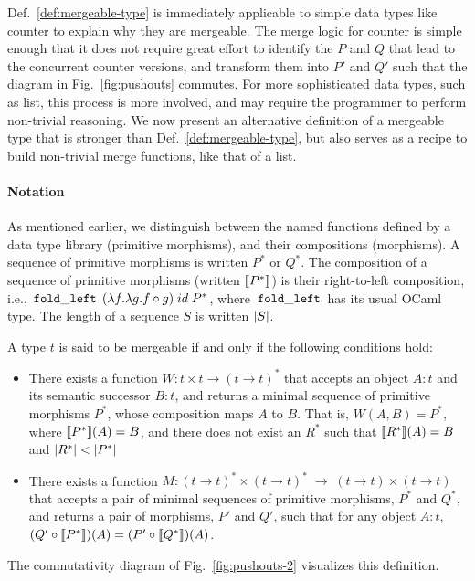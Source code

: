 
Def.~\ref{def:mergeable-type} is immediately applicable to simple data
types like counter to explain why they are mergeable. The merge logic
for counter is simple enough that it does not require great effort to
identify the $P$ and $Q$ that lead to the concurrent counter versions,
and transform them into $P'$ and $Q'$ such that the diagram in
Fig.~\ref{fig:pushouts} commutes. For more
sophisticated data types, such as list, this process is more involved,
and may require the programmer to perform non-trivial reasoning. We
now present an alternative definition of a mergeable type that is
stronger than Def.~\ref{def:mergeable-type}, but also serves as a
recipe to build non-trivial merge functions, like that of a list.

\paragraph{Notation} As mentioned earlier, we distinguish between the
named functions defined by a data type library (primitive morphisms),
and their compositions (morphisms). A sequence of primitive morphisms
is written $P^*$ or $Q^*$. The composition of a sequence of primitive
morphisms (written $\llbracket P^* \rrbracket$) is their right-to-left composition,
i.e., $\,{\tt fold\_left}\,\;(\lambda f.\lambda g. f \circ g)\; id\; P^*$,
where $\,{\tt fold\_left}\,$ has its usual OCaml type. The length of a
sequence $S$ is written $\left|S\right|$.

\begin{definition} 
\label{def:mergeable-type-2}
A type $t$ is said to be mergeable if and only if the following
conditions hold:
\begin{itemize}
  \item There exists a function $W: t \times t \rightarrow (t
  \rightarrow t)^*$ that accepts an object $A:t$ and its
  semantic successor $B:t$, and returns a minimal sequence of
  primitive morphisms $P^*$, whose composition maps $A$ to $B$. That
  is, $W(A,B) = P^*$, where $\llbracket P^* \rrbracket(A) = B$, and there does not
  exist an $R^*$ such that $\llbracket R^* \rrbracket(A) = B$ and $\left|R^*\right| <
  \left|P^*\right|$

  \item There exists a function $M: (t \rightarrow t)^*\!\times\!(t
  \rightarrow t)^* \;\rightarrow\; (t \rightarrow t)\!\times\!(t
  \rightarrow t)$ that accepts a pair of minimal sequences of
  primitive morphisms, $P^*$ and $Q^*$, and returns a pair of morphisms,
  $P'$ and $Q'$, such that for any object $A:t$, $(Q' \circ
  \llbracket P^* \rrbracket)(A) = (P' \circ \llbracket Q^* \rrbracket)(A)$.
\end{itemize}
The commutativity diagram of Fig.~\ref{fig:pushouts-2} visualizes this
definition.
\end{definition}

